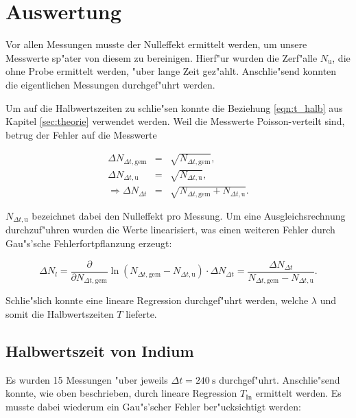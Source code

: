 \section{Auswertung}
	\label{sec:auswertung}
	Vor allen Messungen musste der Nulleffekt ermittelt werden, um unsere Messwerte sp"ater von diesem zu bereinigen.
	Hierf"ur wurden die Zerf"alle $N_{\mathrm{u}}$, die ohne Probe ermittelt werden, "uber lange Zeit gez"ahlt.
	Anschlie"send konnten die eigentlichen Messungen durch\-ge\-f"uhrt werden.
	

	Um auf die Halbwertszeiten zu schlie"sen konnte die Beziehung \eqref{eqn:t_halb} aus Kapitel \ref{sec:theorie} ver\-wen\-det werden.
	Weil die Messwerte Poisson-verteilt sind, betrug der Fehler auf die Messwerte

	\begin{eqnarray*}
		\Delta N_{\Delta t, \mathrm{gem}} & = & \sqrt{N_{\Delta t, \mathrm{gem}}}, \\
		\Delta N_{\Delta t, \mathrm{u}} & = & \sqrt{N_{\Delta t, \mathrm{u}}},\\
		\Rightarrow \Delta N_{\Delta t} & = & \sqrt{N_{\Delta t, \mathrm{gem}} + N_{\Delta t, \mathrm{u}}} .
	\end{eqnarray*}

	$N_{\Delta t, \mathrm{u}}$ bezeichnet dabei den Nulleffekt pro Messung.
	Um eine Ausgleichsrechnung durch\-zu\-f"uh\-ren wurden die Werte linearisiert, was einen weiteren Fehler durch Gau"s'sche Fehlerfortpflanzung erzeugt:

	\begin{equation*}
		\Delta N_{l} = \frac{\partial}{\partial N_{\Delta t, \mathrm{gem}}} \ln{\left( N_{\Delta t, \mathrm{gem}} - N_{\Delta t, \mathrm{u}} \right)} \cdot \Delta N_{\Delta t} = \frac{\Delta N_{\Delta t}}{N_{\Delta t, \mathrm{gem}} - N_{\Delta t, \mathrm{u}}} .
	\end{equation*}

	Schlie"slich konnte eine lineare Regression durchgef"uhrt werden, welche $\lambda$ und somit die Halbwertszeiten $T$ lieferte.

	\subsection{Halbwertszeit von Indium}
		\label{subsec:indium}
		Es wurden 15 Messungen "uber jeweils $\Delta t = \SI{240}{\second}$ durchgef"uhrt.
		Anschlie"send konnte, wie oben beschrieben, durch lineare Regression $T_\mathrm{In}$ ermittelt werden. Es musste dabei wiederum ein Gau"s'scher Fehler ber"ucksichtigt werden:

